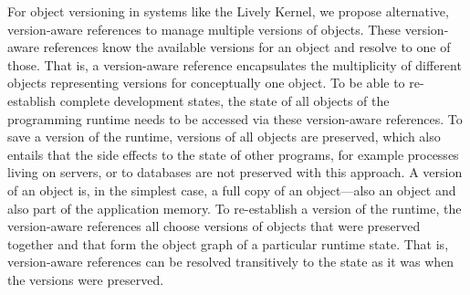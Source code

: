 






For object versioning in systems like the Lively Kernel, we propose alternative, version-aware references to manage multiple versions of objects.
These version-aware references know the available versions for an object and resolve to one of those.
That is, a version-aware reference encapsulates the multiplicity of different objects representing versions for conceptually one object.
To be able to re-establish complete development states, the state of all objects of the programming runtime needs to be accessed via these version-aware references.
To save a version of the runtime, versions of all objects are preserved, which also entails that the side effects to the state of other programs, for example processes living on servers, or to databases are not preserved with this approach.
A version of an object is, in the simplest case, a full copy of an object---also an object and also part of the application memory.
To re-establish a version of the runtime, the version-aware references all choose versions of objects that were preserved together and that form the object graph of a particular runtime state.
That is, version-aware references can be resolved transitively to the state as it was when the versions were preserved.


